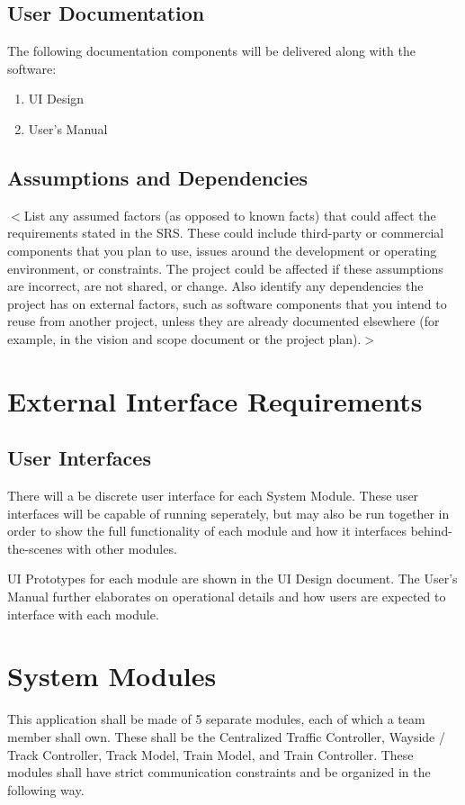 \documentclass{scrreprt}
\begin{document}
\section{User Documentation}

The following documentation components will be delivered along with the software:
\begin{enumerate}
    \item UI Design
    \item User's Manual
\end{enumerate}

\section{Assumptions and Dependencies}

$<$List any assumed factors (as opposed to known facts) that could affect the 
requirements stated in the SRS. These could include third-party or commercial 
components that you plan to use, issues around the development or operating 
environment, or constraints. The project could be affected if these assumptions 
are incorrect, are not shared, or change. Also identify any dependencies the 
project has on external factors, such as software components that you intend to 
reuse from another project, unless they are already documented elsewhere (for 
example, in the vision and scope document or the project plan).$>$


\chapter{External Interface Requirements}

\section{User Interfaces}
There will a be discrete user interface for each System Module. These user
interfaces will be capable of running seperately, but may also be run together
in order to show the full functionality of each module and how it interfaces
behind-the-scenes with other modules.

UI Prototypes for each module are shown in the UI Design document. The User's
Manual further elaborates on operational details and how users are expected to
interface with each module.

\chapter{System Modules}
This application shall be made of 5 separate modules, each of which a team member shall own.
These shall be the Centralized Traffic Controller, Wayside / Track Controller, Track Model, Train Model, and Train Controller.
These modules shall have strict communication constraints and be organized in the following way.
\end{document}
